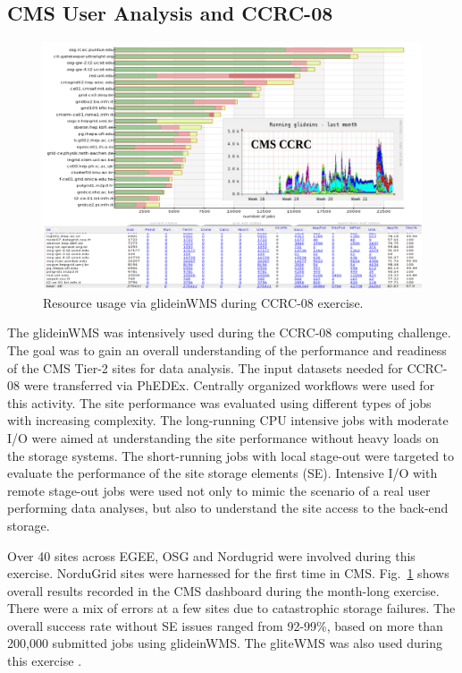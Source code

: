 \documentclass[a4paper]{jpconf}
\begin{document}
\subsection{CMS User Analysis and CCRC-08}
\begin{figure}
\begin{center}
\includegraphics[scale=0.55]{glideins_ccrc08}
\end{center}
\caption{Resource usage via glideinWMS during CCRC-08 exercise.}
\label{fig:glideins_ccrc}
\end{figure}
The glideinWMS was intensively used during the CCRC-08 computing challenge. The goal was to gain an overall understanding 
of the performance and readiness of the CMS Tier-2 sites for data analysis. The input datasets needed for CCRC-08 were transferred
via PhEDEx. Centrally organized workflows were used for this activity. The site performance
was evaluated using different types of jobs with increasing complexity. The long-running 
CPU intensive jobs with moderate I/O were aimed at understanding the site performance without
heavy loads on the storage systems. The short-running jobs with local stage-out were targeted
to evaluate the performance of the site storage elements (SE). Intensive I/O with remote stage-out
jobs were used not only to mimic the scenario of a real user performing data analyses, but also
to understand the site access to the back-end storage.

Over 40 sites across EGEE, OSG and Nordugrid were involved during this exercise. NorduGrid sites 
were harnessed for the first time in CMS. Fig.~\ref{fig:glideins_ccrc} shows overall results recorded in the CMS dashboard 
during the month-long exercise. There were a mix of errors at a few sites due to catastrophic storage 
failures. The overall success rate without SE issues ranged from 92-99\%, based on more than 200,000 
submitted jobs using glideinWMS. The gliteWMS was also used during this exercise \cite{bib:cms_glite}.
\end{document}

